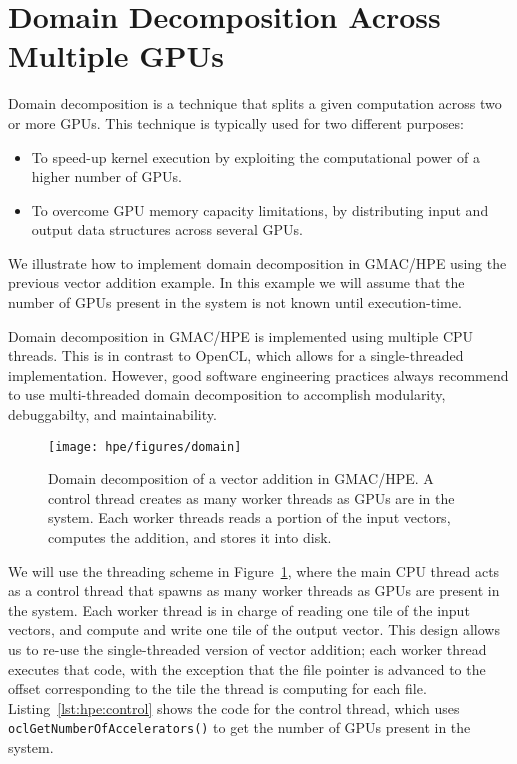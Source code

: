 \section{Domain Decomposition Across Multiple GPUs}
Domain decomposition is a technique that splits a given computation across two or more GPUs. This 
technique is typically used for two different purposes:
\begin{itemize}
\item To speed\hyp{}up kernel execution by exploiting the computational power of a higher number of 
GPUs.
\item To overcome GPU memory capacity limitations, by distributing input and output data structures 
across several GPUs.
\end{itemize}

We illustrate how to implement domain decomposition in GMAC\slash HPE using the previous vector 
addition example. In this example we will assume that the number of GPUs present in the system is 
not known until execution\hyp{}time.

Domain decomposition in GMAC\slash HPE is implemented using multiple CPU threads. This is in 
contrast to OpenCL, which allows for a single\hyp{}threaded implementation. However, good software 
engineering practices always recommend to use multi\hyp{}threaded domain decomposition to accomplish 
modularity, debuggabilty, and maintainability. 

\begin{figure}
\centering
\texttt{[image: hpe/figures/domain]}
\caption{Domain decomposition of a vector addition in GMAC\slash HPE\@. A control thread creates as 
many worker threads as GPUs are in the system. Each worker threads reads a portion of the input 
vectors, computes the addition, and stores it into disk.}
\label{fig:hpe:domain}
\end{figure}



We will use the threading scheme in Figure~\ref{fig:hpe:domain}, where the main CPU thread acts as a 
control thread that spawns as many worker threads as GPUs are present in the system. Each worker 
thread is in charge of reading one tile of the input vectors, and compute and write one tile of the 
output vector. This design allows us to re\hyp{}use the single\hyp{}threaded version of vector 
addition; each worker thread executes that code, with the exception that the file pointer is 
advanced to the offset corresponding to the tile the thread is computing for each file.  
Listing~\ref{lst:hpe:control} shows the code for the control thread, which uses 
\texttt{ocl\-Get\-Number\-Of\-Accelerators()} to get the number of GPUs present in the system.

